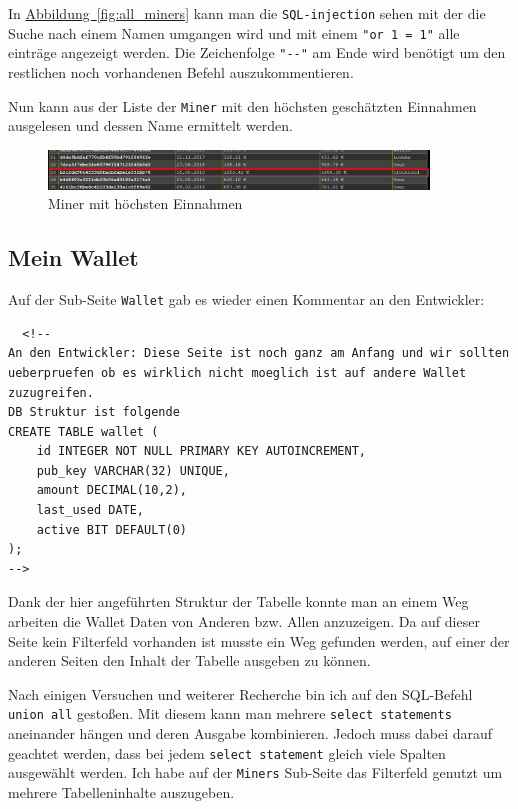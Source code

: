 \documentclass[12pt,a4paper,titlepage,oneside]{scrartcl}
\begin{document}
In \hyperref[fig:all_miners]{Abbildung~\ref*{fig:all_miners}} kann man die \lstinline{SQL-injection} sehen mit der die Suche nach einem Namen umgangen wird und mit einem \lstinline{"or 1 = 1"} alle einträge angezeigt werden. Die Zeichenfolge \lstinline{"--"} am Ende wird benötigt um den restlichen noch vorhandenen Befehl auszukommentieren.

Nun kann aus der Liste der \lstinline{Miner} mit den höchsten geschätzten Einnahmen ausgelesen und dessen Name ermittelt werden.

\begin{figure}[h!]
  \centering
  \includegraphics[width=0.9\textwidth]{./imgs/manager9000/highest_miner.png}
\caption{Miner mit höchsten Einnahmen}
\label{fig:highest_miner}
\end{figure}

\subsection{Mein Wallet}

Auf der Sub-Seite \lstinline{Wallet} gab es wieder einen Kommentar an den Entwickler:

\begin{lstlisting}
  <!--
An den Entwickler: Diese Seite ist noch ganz am Anfang und wir sollten ueberpruefen ob es wirklich nicht moeglich ist auf andere Wallet zuzugreifen.
DB Struktur ist folgende
CREATE TABLE wallet (
	id INTEGER NOT NULL PRIMARY KEY AUTOINCREMENT,
	pub_key VARCHAR(32) UNIQUE,
	amount DECIMAL(10,2),
	last_used DATE,
	active BIT DEFAULT(0)
);
-->
\end{lstlisting}

Dank der hier angeführten Struktur der Tabelle konnte man an einem Weg arbeiten die Wallet Daten von Anderen bzw. Allen anzuzeigen. Da auf dieser Seite kein Filterfeld vorhanden ist musste ein Weg gefunden werden, auf einer der anderen Seiten den Inhalt der Tabelle ausgeben zu können.

Nach einigen Versuchen und weiterer Recherche bin ich auf den SQL-Befehl \lstinline{union all} gestoßen. Mit diesem kann man mehrere \lstinline{select statements} aneinander hängen und deren Ausgabe kombinieren. Jedoch muss dabei darauf geachtet werden, dass bei jedem \lstinline{select statement} gleich viele Spalten ausgewählt werden. Ich habe auf der \lstinline{Miners} Sub-Seite das Filterfeld genutzt um mehrere Tabelleninhalte auszugeben.
\end{document}
